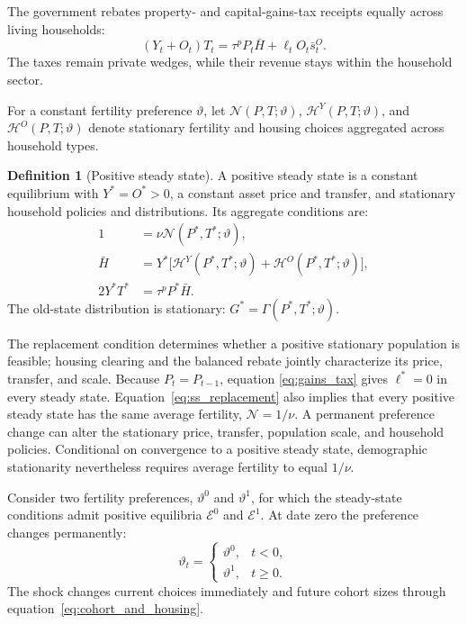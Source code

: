 \documentclass[10pt]{article}
\theoremstyle{definition}
\newtheorem{definition}{Definition}
\begin{document}
The government rebates property- and capital-gains-tax receipts equally across
living households:
\begin{equation}
 (Y_t+O_t)T_t
 =\tau^pP_t\bar H+\ell_t O_t\bar s_t^O.
 \label{eq:government_budget}
\end{equation}
The taxes remain private wedges, while their revenue stays within the household
sector.

For a constant fertility preference $\vartheta$, let
$\mathcal N(P,T;\vartheta)$, $\mathcal H^Y(P,T;\vartheta)$, and
$\mathcal H^O(P,T;\vartheta)$ denote stationary fertility and housing choices
aggregated across household types.

\begin{definition}[Positive steady state]
A positive steady state is a constant equilibrium with $Y^*=O^*>0$, a constant
asset price and transfer, and stationary household policies and distributions.
Its aggregate conditions are:
\begin{align}
 1&=\nu\mathcal N(P^*,T^*;\vartheta),
 \label{eq:ss_replacement}\\
 \bar H&=Y^*\big[\mathcal H^Y(P^*,T^*;\vartheta)+
 \mathcal H^O(P^*,T^*;\vartheta)\big],
 \label{eq:ss_housing}\\
 2Y^*T^*&=\tau^pP^*\bar H.
 \label{eq:ss_government}
\end{align}
The old-state distribution is stationary: $G^*=\Gamma(P^*,T^*;\vartheta)$.
\end{definition}
The replacement condition determines whether a positive stationary population
is feasible; housing clearing and the balanced rebate jointly characterize its
price, transfer, and scale. Because $P_t=P_{t-1}$, equation
\eqref{eq:gains_tax} gives $\ell^*=0$ in every steady state.
Equation~\eqref{eq:ss_replacement} also implies that every positive steady state
has the same average fertility, $\mathcal N=1/\nu$. A permanent preference
change can alter the stationary price, transfer, population scale, and household
policies. Conditional on convergence to a positive steady state, demographic
stationarity nevertheless requires average fertility to equal $1/\nu$.

Consider two fertility preferences, $\vartheta^0$ and $\vartheta^1$, for which
the steady-state conditions admit positive equilibria $\mathcal E^0$ and
$\mathcal E^1$. At date zero the preference changes permanently:
\begin{equation}
 \vartheta_t=
 \begin{cases}
  \vartheta^0,&t<0,\\
  \vartheta^1,&t\geq0.
 \end{cases}
 \label{eq:preference_shock}
\end{equation}
The shock changes current choices immediately and future cohort sizes through
equation~\eqref{eq:cohort_and_housing}.
\end{document}
